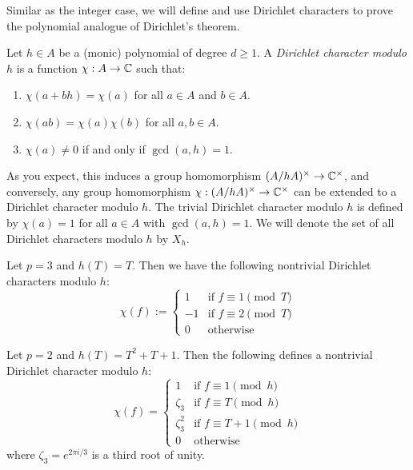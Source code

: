 Similar as the integer case, we will define and use Dirichlet characters to prove the polynomial analogue of Dirichlet's theorem.

\begin{definition}
    \label{def:dirichlet-character-poly}
    Let $h \in A$ be a (monic) polynomial of degree $d \geq 1$.
    A \emph{Dirichlet character modulo $h$} is a function $\chi: A \to \mathbb{C}$ such that:
    \begin{enumerate}
        \item $\chi(a + bh) = \chi(a)$ for all $a \in A$ and $b \in A$.
        \item $\chi(ab) = \chi(a)\chi(b)$ for all $a, b \in A$.
        \item $\chi(a) \ne 0$ if and only if $\gcd(a, h) = 1$.
    \end{enumerate}
\end{definition}

As you expect, this induces a group homomorphism $(A / hA)^\times \to \mathbb{C}^\times$, and conversely, any group homomorphism $\chi: (A / hA)^\times \to \mathbb{C}^\times$ can be extended to a Dirichlet character modulo $h$.
The trivial Dirichlet character modulo $h$ is defined by $\chi(a) = 1$ for all $a \in A$ with $\gcd(a, h) = 1$.
We will denote the set of all Dirichlet characters modulo $h$ by $X_h$.

\begin{example}
    \label{ex:dirichlet-character1}
    Let $p = 3$ and $h(T) = T$.
    Then we have the following nontrivial Dirichlet characters modulo $h$:    
    \[
    \chi(f) := \begin{cases}
        1 & \text{if } f \equiv 1 \pmod{T} \\
        -1 & \text{if } f \equiv 2 \pmod{T} \\
        0 & \text{otherwise}
    \end{cases}
    \]
\end{example}

\begin{example}
    \label{ex:dirichlet-character2}
    Let $p = 2$ and $h(T) = T^2 + T + 1$.
    Then the following defines a nontrivial Dirichlet character modulo $h$:
    \[
    \chi(f) = \begin{cases}
        1 & \text{if } f \equiv 1 \pmod{h} \\
        \zeta_3 & \text{if } f \equiv T \pmod{h} \\
        \zeta_3^2 & \text{if } f \equiv T + 1 \pmod{h} \\
        0 & \text{otherwise}
    \end{cases}
    \]
    where $\zeta_3 = e^{2\pi i / 3}$ is a third root of unity.
\end{example}

